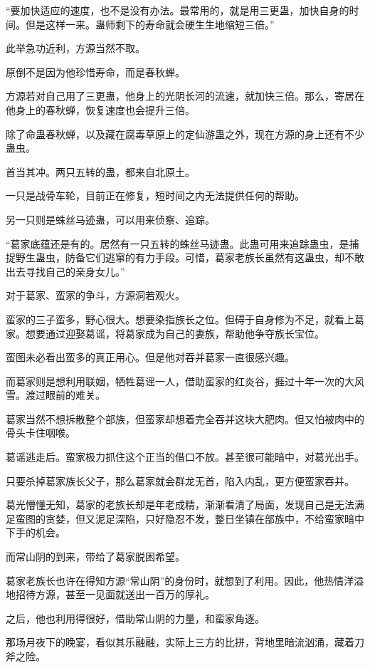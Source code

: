 \begin{this_body}
“要加快适应的速度，也不是没有办法。最常用的，就是用三更蛊，加快自身的时间。但是这样一来。蛊师剩下的寿命就会硬生生地缩短三倍。”

此举急功近利，方源当然不取。

原倒不是因为他珍惜寿命，而是春秋蝉。

方源若对自己用了三更蛊，他身上的光阴长河的流速，就加快三倍。那么，寄居在他身上的春秋蝉，恢复速度也会提升三倍。

除了命蛊春秋蝉，以及藏在腐毒草原上的定仙游蛊之外，现在方源的身上还有不少蛊虫。

首当其冲。两只五转的蛊，都来自北原土。

一只是战骨车轮，目前正在修复，短时间之内无法提供任何的帮助。

另一只则是蛛丝马迹蛊，可以用来侦察、追踪。

“葛家底蕴还是有的。居然有一只五转的蛛丝马迹蛊。此蛊可用来追踪蛊虫，是捕捉野生蛊虫，防备它们逃窜的有力手段。可惜，葛家老族长虽然有这蛊虫，却不敢出去寻找自己的亲身女儿。”

对于葛家、蛮家的争斗，方源洞若观火。

蛮家的三子蛮多，野心很大。想要染指族长之位。但碍于自身修为不足，就看上葛家。想要通过迎娶葛谣，将葛家成为自己的妻族，帮助他争夺族长宝位。

蛮图未必看出蛮多的真正用心。但是他对吞并葛家一直很感兴趣。

而葛家则是想利用联姻，牺牲葛谣一人，借助蛮家的红炎谷，捱过十年一次的大风雪。渡过眼前的难关。

葛家当然不想拆散整个部族，但蛮家却想着完全吞并这块大肥肉。但又怕被肉中的骨头卡住咽喉。

葛谣逃走后。蛮家极力抓住这个正当的借口不放。甚至很可能暗中，对葛光出手。

只要杀掉葛家族长父子，那么葛家就会群龙无首，陷入内乱，更方便蛮家吞并。

葛光懵懂无知，葛家的老族长却是年老成精，渐渐看清了局面，发现自己是无法满足蛮图的贪婪，但又泥足深陷，只好隐忍不发，整日坐镇在部族中，不给蛮家暗中下手的机会。

而常山阴的到来，带给了葛家脱困希望。

葛家老族长也许在得知方源“常山阴”的身份时，就想到了利用。因此，他热情洋溢地招待方源，甚至一见面就送出一百万的厚礼。

之后，他也利用得很好，借助常山阴的力量，和蛮家角逐。

那场月夜下的晚宴，看似其乐融融，实际上三方的比拼，背地里暗流汹涌，藏着刀斧之险。


\end{this_body}
